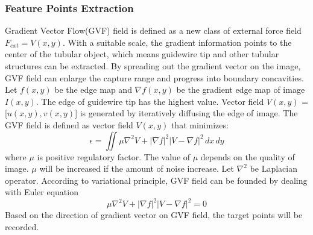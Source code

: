 \documentclass[journal]{IEEEtran}
\begin{document}
\subsubsection{Feature Points Extraction}
Gradient Vector Flow(GVF) field is defined as a new class of external force field $F_{ext} = V(x,y)$. With a suitable scale, the gradient information points to the center of the tubular object, which means guidewire tip and other tubular structures can be extracted.
By spreading out the gradient vector on the image, GVF field can enlarge the capture range and progress into boundary concavities. Let $f(x,y)$ be the edge map and $\nabla$$f(x,y)$ be the gradient edge map of image $I(x,y)$. The edge of guidewire tip has the highest value. Vector field $V(x,y)$ = [$u(x,y),v(x,y)$] is generated by iteratively diffusing the edge of image. The GVF field is defined as vector field $V(x,y)$ that minimizes:
\begin{equation}{
\epsilon = \iint \mu\nabla^{2}V+|\nabla f|^{2}|V-\nabla f|^{2} \,dx \,dy}
\end{equation}
where $\mu$ is positive regulatory factor. The value of $\mu$ depends on the quality of image. $\mu$ will be increased if the amount of noise increase. 
Let $\nabla^{2}$ be Laplacian operator. According to variational principle, GVF field can be founded by dealing with Euler equation
\begin{equation}{
\mu\nabla^{2}V+|\nabla f|^{2}|V-\nabla f|^{2}=0}
\end{equation}
Based on the direction of gradient vector on GVF field, the target points will be recorded.
\end{document}
